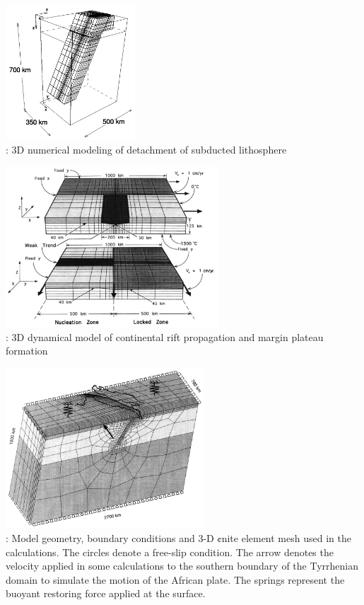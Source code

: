 \begin{center}
\begin{minipage}{0.45\textwidth}
\centering
\includegraphics[height=5cm]{images/history/yowo95}\\
{: 3D numerical modeling of detachment of subducted 
lithosphere \cite{yowo95}}
\end{minipage}\hfill
\begin{minipage}{0.45\textwidth}
\centering
\includegraphics[height=6cm]{images/history/dusa96}\\
{: 3D dynamical model of continental rift propagation and 
margin plateau formation \cite{dusa96}}
\end{minipage}
\end{center}



\begin{center}
\includegraphics[height=6cm]{images/history/nesb99}\\
{: Model geometry, boundary conditions and 3-D ¢nite element mesh used in 
the calculations. The circles denote a free-slip condition. The arrow denotes the velocity 
applied in some calculations to the southern boundary of the Tyrrhenian domain to simulate 
the motion of the African plate. The springs represent the buoyant restoring force applied 
at the surface. \cite{nesb99}}
\end{center}




